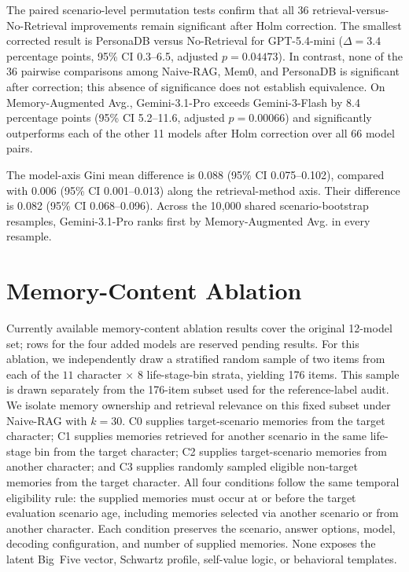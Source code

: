 \documentclass[11pt]{article}
\begin{document}
The paired scenario-level permutation tests confirm that all 36 retrieval-versus-No-Retrieval improvements remain significant after Holm correction. The smallest corrected result is PersonaDB versus No-Retrieval for GPT-5.4-mini ($\Delta{=}3.4$ percentage points, 95\% CI 0.3--6.5, adjusted $p{=}0.04473$). In contrast, none of the 36 pairwise comparisons among Naive-RAG, Mem0, and PersonaDB is significant after correction; this absence of significance does not establish equivalence. On Memory-Augmented Avg., Gemini-3.1-Pro exceeds Gemini-3-Flash by 8.4 percentage points (95\% CI 5.2--11.6, adjusted $p{=}0.00066$) and significantly outperforms each of the other 11 models after Holm correction over all 66 model pairs.

The model-axis Gini mean difference is 0.088 (95\% CI 0.075--0.102), compared with 0.006 (95\% CI 0.001--0.013) along the retrieval-method axis. Their difference is 0.082 (95\% CI 0.068--0.096). Across the 10{,}000 shared scenario-bootstrap resamples, Gemini-3.1-Pro ranks first by Memory-Augmented Avg. in every resample.

\section{Memory-Content Ablation}
\label{app:memory_ablation}

Currently available memory-content ablation results cover the original 12-model set; rows for the four added models are reserved pending results. For this ablation, we independently draw a stratified random sample of two items from each of the $11$ character $\times$ $8$ life-stage-bin strata, yielding 176 items. This sample is drawn separately from the 176-item subset used for the reference-label audit. We isolate memory ownership and retrieval relevance on this fixed subset under Naive-RAG with $k{=}30$. C0 supplies target-scenario memories from the target character; C1 supplies memories retrieved for another scenario in the same life-stage bin from the target character; C2 supplies target-scenario memories from another character; and C3 supplies randomly sampled eligible non-target memories from the target character. All four conditions follow the same temporal eligibility rule: the supplied memories must occur at or before the target evaluation scenario age, including memories selected via another scenario or from another character. Each condition preserves the scenario, answer options, model, decoding configuration, and number of supplied memories. None exposes the latent Big~Five vector, Schwartz profile, self-value logic, or behavioral templates.
\end{document}
